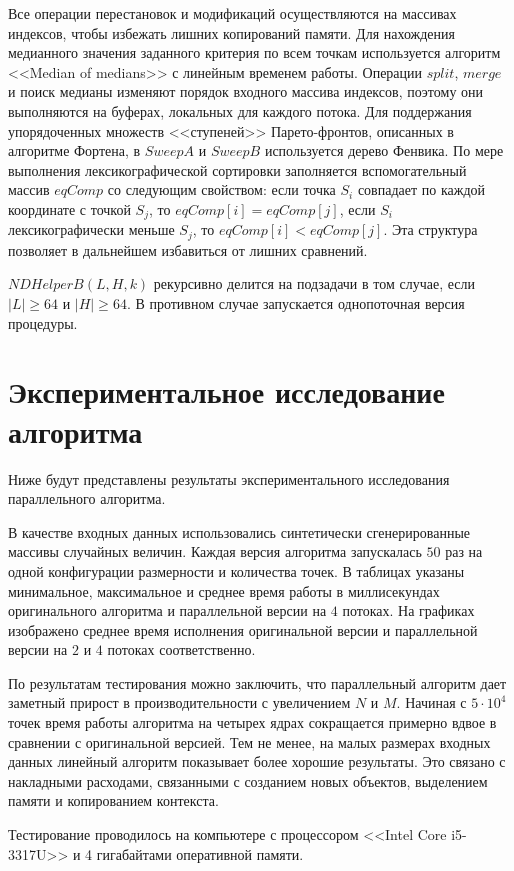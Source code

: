 Все операции перестановок и модификаций осуществляются на массивах индексов, чтобы избежать лишних копирований памяти.
Для нахождения медианного значения заданного критерия по всем точкам используется алгоритм <<Median of medians>> с линейным временем работы.
Операции $split$, $merge$ и поиск медианы изменяют порядок входного массива индексов, поэтому они выполняются на буферах, локальных для каждого потока.
Для поддержания упорядоченных множеств <<ступеней>> Парето-фронтов, описанных в алгоритме Фортена, в $SweepA$ и $SweepB$ используется дерево Фенвика.
По мере выполнения лексикографической сортировки заполняется вспомогательный массив $eqComp$ со следующим свойством: если точка $S_i$ совпадает по каждой координате с точкой $S_j$, то $eqComp[i] = eqComp[j]$, если $S_i$ лексикографически меньше $S_j$, то $eqComp[i] < eqComp[j]$.
Эта структура позволяет в дальнейшем избавиться от лишних сравнений.

$NDHelperB(L, H, k)$ рекурсивно делится на подзадачи в том случае, если $|L|\geq 64$ и $|H|\geq 64$. В противном случае запускается однопоточная версия процедуры.  

\section{Экспериментальное исследование алгоритма}
Ниже будут представлены результаты экспериментального исследования параллельного алгоритма.

В качестве входных данных использовались синтетически сгенерированные массивы случайных величин.
Каждая версия алгоритма запускалась $50$ раз на одной конфигурации размерности и количества точек.
В таблицах указаны минимальное, максимальное и среднее время работы в миллисекундах оригинального алгоритма и параллельной версии на $4$ потоках.
На графиках изображено среднее время исполнения оригинальной версии и параллельной версии на $2$ и $4$ потоках соответственно.

По результатам тестирования можно заключить, что параллельный алгоритм дает заметный прирост в производительности с увеличением $N$ и $M$.
Начиная с $5\cdot 10^4$ точек время работы алгоритма на четырех ядрах сокращается примерно вдвое в сравнении с оригинальной версией.
Тем не менее, на малых размерах входных данных линейный алгоритм показывает более хорошие результаты.
Это связано с накладными расходами, связанными с созданием новых объектов, выделением памяти и копированием контекста.

Тестирование проводилось на компьютере с процессором <<Intel Core i5-3317U>> и 4 гигабайтами оперативной памяти.


